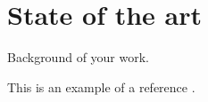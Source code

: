\chapter{State of the art}
\label{sect::background}

Background of your work.

This is an example of a reference \parencite{Croff1983}.